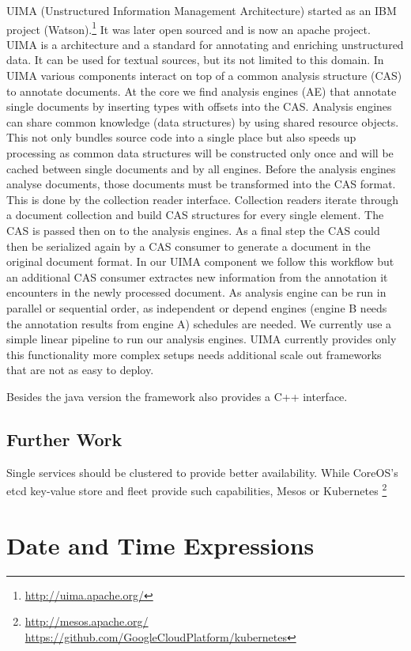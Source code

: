 \documentclass[12pt, draft]{article}
\begin{document}
UIMA (Unstructured Information Management Architecture) started as an
 IBM project (Watson).\footnote{\url{http://uima.apache.org/}}
It was later open sourced and is now an apache project.
UIMA is a architecture and a standard for annotating and enriching unstructured data.
It can be used for textual sources, but its not limited to this domain.
In UIMA various components interact on top of a common analysis structure (CAS)
to annotate documents. At the core we find analysis engines (AE) that
annotate single documents by inserting types with offsets into the CAS.
Analysis engines can share common knowledge (data structures) by
using shared resource objects. This not only bundles
source code into a single place but also speeds up processing as
common data structures will be constructed only once and will be cached
between single documents and by all engines.
Before the analysis engines analyse documents, those documents
must be transformed into the CAS format.
This is done by the collection reader interface. Collection readers
iterate through a document collection and build CAS structures
for every single element. The CAS is passed then on to the analysis engines.
As a final step the CAS could then be serialized again
by a CAS consumer to generate a document in the original document format.
In our UIMA component we follow this workflow but an additional CAS consumer
extractes new information from the annotation it encounters
in the newly processed document.  As analysis engine can be run in
parallel or sequential order, as independent or
depend engines (engine B needs the annotation results from engine A)
schedules are needed. We currently use a simple linear pipeline to
run our analysis engines. UIMA currently provides only this functionality
more complex setups needs additional scale out frameworks that are
not as easy to deploy.




Besides the java version the framework also provides a C++ interface.

\subsection{Further Work}

Single services should be clustered to provide better availability. While CoreOS's etcd key-value store
and fleet provide such capabilities, Mesos or Kubernetes
\footnote{\url{http://mesos.apache.org/} \url{https://github.com/GoogleCloudPlatform/kubernetes}}


\section{Date and Time Expressions}
\end{document}
